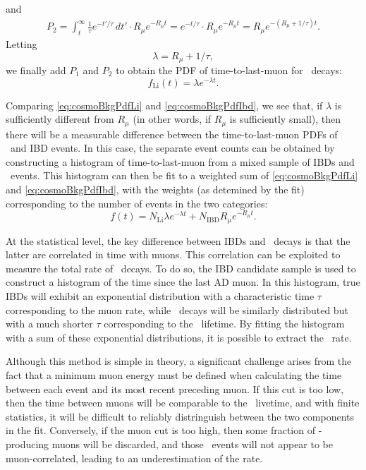 \documentclass[../thesis.tex]{subfiles}
\begin{document}
and
\begin{align*}
  P_2 = \int_t^\infty \frac{1}{\tau}e^{-t'/\tau}\,dt' \cdot R_\mu e^{-R_\mu t} = e^{-t/\tau} \cdot R_\mu e^{-R_\mu t} = R_\mu e^{-(R_\mu + 1/\tau)t}.
\end{align*}
Letting
\begin{equation*}
  \lambda = R_\mu + 1/\tau,
\end{equation*}
we finally add $P_1$ and $P_2$ to obtain the PDF of time-to-last-muon for \linine\ decays:
\begin{equation}
  \label{eq:cosmoBkgPdfLi}
  f_{\mathrm{Li}}(t) = \lambda e^{-\lambda t}.
\end{equation}

Comparing \autoref{eq:cosmoBkgPdfLi} and \autoref{eq:cosmoBkgPdfIbd}, we see that, if $\lambda$ is sufficiently different from $R_\mu$ (in other words, if $R_\mu$ is sufficiently small), then there will be a measurable difference between the time-to-last-muon PDFs of \linine\ and IBD events. In this case, the separate event counts can be obtained by constructing a histogram of time-to-last-muon from a mixed sample of IBDs and \linine\ events. This histogram can then be fit to a weighted sum of \autoref{eq:cosmoBkgPdfLi} and \autoref{eq:cosmoBkgPdfIbd}, with the weights (as detemined by the fit) corresponding to the number of events in the two categories:
\begin{equation*}
  f(t) = N_{\mathrm{Li}} \lambda e^{-\lambda t} + N_{\mathrm{IBD}} R_\mu e^{-R_\mu t}.
\end{equation*}

At the statistical level, the key difference between IBDs and \linine\ decays is that the latter are correlated in time with muons. This correlation can be exploited to measure the total rate of \linine\ decays. To do so, the IBD candidate sample is used to construct a histogram of the time since the last AD muon. In this histogram, true IBDs will exhibit an exponential distribution with a characteristic time $\tau$ corresponding to the muon rate, while \linine\ decays will be similarly distributed but with a much shorter $\tau$ corresponding to the \linine\ lifetime. By fitting the histogram with a sum of these exponential distributions, it is possible to extract the \linine\ rate.

Although this method is simple in theory, a significant challenge arises from the fact that a minimum muon energy must be defined when calculating the time between each event and its most recent preceding muon. If this cut is too low, then the time between muons will be comparable to the \linine\ livetime, and with finite statistics, it will be difficult to reliably distringuish between the two components in the fit. Conversely, if the muon cut is too high, then some fraction of \linine-producing muons will be discarded, and those \linine\ events will not appear to be muon-correlated, leading to an underestimation of the rate.
\end{document}
